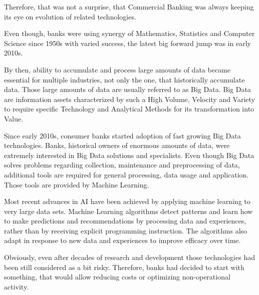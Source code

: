 Therefore, that was not a surprise, that Commercial Banking was always keeping its eye on evolution of related technologies.

Even though, banks were using synergy of Mathematics, Statistics and Computer Science since 1950s with varied success, the latest big forward jump was in early 2010s. 

By then, ability to accumulate and process large amounts of data became essential for multiple industries, not only the one, that historically accumulate data. 
\cite{forbes_big_data_history}
Those large amounts of data are usually referred to as Big Data.
Big Data are information assets characterized by such a High Volume, Velocity and Variety to require specific Technology and Analytical Methods for its transformation into Value.
\cite{what_is_big_data}

Since early 2010s, consumer banks started adoption of fast growing Big Data technologies. 
Banks, historical owners of enormous amounts of data, were extremely interested in Big Data solutions and specialists. 
Even though Big Data solves problems regarding collection, maintenance and preprocessing of data, additional tools are required for general processing, data usage and application.
Those tools are provided by Machine Learning.

Most recent advances in AI have been achieved by applying machine learning to very large data sets. 
Machine Learning algorithms detect patterns and learn how to make predictions and recommendations by processing data and experiences, rather than by receiving explicit programming instruction. 
The algorithms also adapt in response to new data and experiences to improve efficacy over time. 
\cite{executive_guide_to_ai}

Obviously, even after decades of research and development those technologies had been still considered as a bit risky.
Therefore, banks had decided to start with something, that would allow reducing costs or optimizing non-operational activity.

